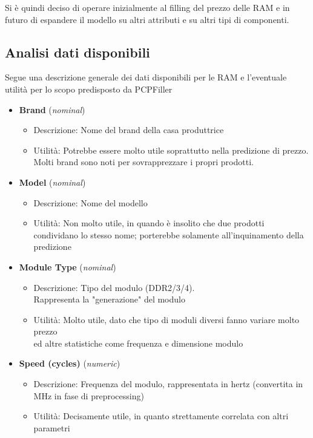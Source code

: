 \documentclass[12pt]{report}
\begin{document}
Si è quindi deciso di operare inizialmente al filling del prezzo delle RAM e in futuro di espandere
il modello su altri attributi e su altri tipi di componenti.

\newpage
\subsection{Analisi dati disponibili}

Segue una descrizione generale dei dati disponibili per le RAM e l'eventuale utilità per lo scopo predisposto da PCPFiller
\begin{itemize}
	\item \textbf{Brand} (\textit{nominal})
		\begin{itemize}
			\item Descrizione: Nome del brand della casa produttrice
			\item Utilità: Potrebbe essere molto utile soprattutto nella predizione di prezzo. Molti brand sono noti per sovrapprezzare i propri prodotti.
		\end{itemize}
	\item \textbf{Model} (\textit{nominal})
		\begin{itemize}
			\item Descrizione: Nome del modello
			\item Utilità: Non molto utile, in quando è insolito che due prodotti condividano lo stesso nome; porterebbe solamente all'inquinamento della predizione
		\end{itemize}
	\item \textbf{Module Type} (\textit{nominal})
		\begin{itemize}
			\item Descrizione: Tipo del modulo (DDR2/3/4).\\Rappresenta la "generazione" del modulo
			\item Utilità: Molto utile, dato che tipo di moduli diversi fanno variare molto prezzo\\ ed altre statistiche come frequenza e dimensione modulo
		\end{itemize}
	\item \textbf{Speed (cycles)} (\textit{numeric})
		\begin{itemize}
			\item Descrizione: Frequenza del modulo, rappresentata in hertz (convertita in MHz in fase di preprocessing)
			\item Utilità: Decisamente utile, in quanto strettamente correlata con altri parametri

\end{itemize}
\end{itemize}
\end{document}
